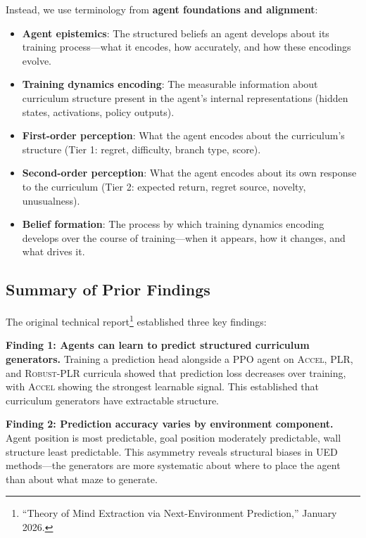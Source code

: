 \documentclass[11pt,a4paper]{article}
\theoremstyle{remark}
\newcommand{\accel}{\textsc{Accel}}
\newcommand{\plr}{\textsc{PLR}}
\newcommand{\rplr}{\textsc{Robust-PLR}}
\begin{document}
Instead, we use terminology from \textbf{agent foundations and alignment}:
\begin{itemize}[nosep]
    \item \textbf{Agent epistemics}: The structured beliefs an agent develops about its training process---what it encodes, how accurately, and how these encodings evolve.
    \item \textbf{Training dynamics encoding}: The measurable information about curriculum structure present in the agent's internal representations (hidden states, activations, policy outputs).
    \item \textbf{First-order perception}: What the agent encodes about the curriculum's structure (Tier 1: regret, difficulty, branch type, score).
    \item \textbf{Second-order perception}: What the agent encodes about its own response to the curriculum (Tier 2: expected return, regret source, novelty, unusualness).
    \item \textbf{Belief formation}: The process by which training dynamics encoding develops over the course of training---when it appears, how it changes, and what drives it.
\end{itemize}

\subsection{Summary of Prior Findings}

The original technical report\footnote{``Theory of Mind Extraction via Next-Environment Prediction,'' January 2026.} established three key findings:

\textbf{Finding 1: Agents can learn to predict structured curriculum generators.} Training a prediction head alongside a PPO agent on \accel{}, \plr{}, and \rplr{} curricula showed that prediction loss decreases over training, with \accel{} showing the strongest learnable signal. This established that curriculum generators have extractable structure.

\textbf{Finding 2: Prediction accuracy varies by environment component.} Agent position is most predictable, goal position moderately predictable, wall structure least predictable. This asymmetry reveals structural biases in UED methods---the generators are more systematic about where to place the agent than about what maze to generate.
\end{document}
